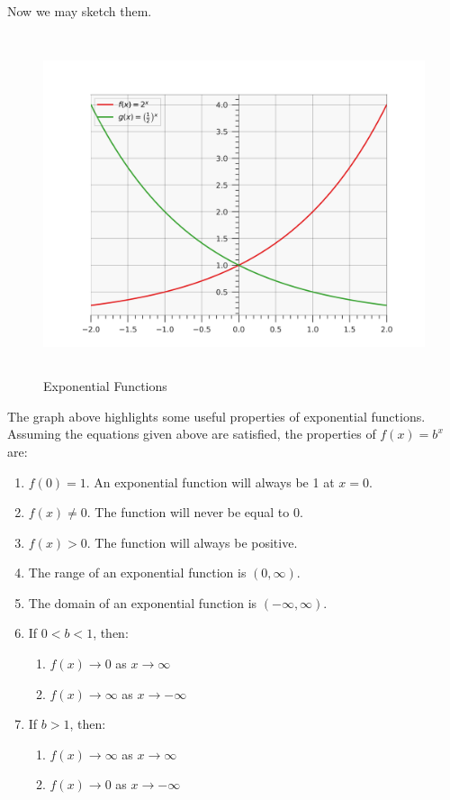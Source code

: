 \documentclass[12pt]{article}
\theoremstyle{definition}
\begin{document}
Now we may sketch them.

\begin{figure}[H]
    \centering
    \includegraphics[width=12.5cm, height=10cm]{exponential_functions_1.png}
    \caption{Exponential Functions}
    \label{fig:fig1}
\end{figure}

The graph above highlights some useful properties of exponential functions.
Assuming the equations given above are satisfied, the properties of $f(x)=b^x$ are:

\begin{enumerate}
    \item $f(0) = 1 $. An exponential function will always be 1 at $x=0$.
    \item $f(x) \neq 0$. The function will never be equal to 0.
    \item $f(x) > 0$. The function will always be positive.
    \item The range of an exponential function is $(0, \infty)$.
    \item The domain of an exponential function is $(-\infty, \infty)$.
    \item If $0 < b < 1$, then:
          \begin{enumerate}
              \item $f(x) \rightarrow 0$ as $x \rightarrow \infty$
              \item $f(x) \rightarrow \infty$ as $x \rightarrow -\infty$
          \end{enumerate}
    \item If $b > 1$, then:
          \begin{enumerate}
              \item $f(x) \rightarrow \infty$ as $x \rightarrow \infty$
              \item $f(x) \rightarrow 0$ as $x \rightarrow -\infty$
          \end{enumerate}
\end{enumerate}
\end{document}
